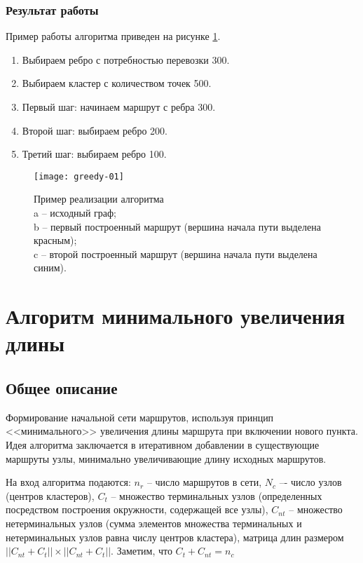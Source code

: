 \subsubsection{Результат работы}
Пример работы алгоритма приведен на рисунке \ref{img:greedy-01}.
\begin{enumerate}
    \item Выбираем ребро с потребностью перевозки 300.
    \item Выбираем кластер с количеством точек 500.
    \item Первый шаг: начинаем маршрут с ребра 300.
    \item Второй шаг: выбираем ребро 200.
    \item Третий шаг: выбираем ребро 100.
\end{enumerate}

\begin{figure}[h!]
    \centering
    \texttt{[image: greedy-01]}
    \caption{Пример реализации алгоритма\\
        a -- исходный граф;\\
        b -- первый построенный маршрут (вершина начала пути выделена красным);\\
        c -- второй построенный маршрут (вершина начала пути выделена синим).
    }
   \label{img:greedy-01}
\end{figure}

\section{Алгоритм минимального увеличения длины}
\label{sec:second_alg}
\subsection{Общее описание}
Формирование начальной сети маршрутов, используя принцип <<минимального>> увеличения длины маршрута при 
включении нового пункта. Идея алгоритма заключается в итеративном добавлении в существующие маршруты узлы, 
минимально увеличивающие длину исходных маршрутов. 

На вход алгоритма подаются: \( n_r \) -- число маршрутов в сети, \( N_c \) –- число узлов 
(центров кластеров), \( C_t \) – множество терминальных узлов (определенных посредством построения 
окружности, содержащей все узлы), \( C_{nt} \) -- множество нетерминальных узлов (сумма элементов множества 
терминальных и нетерминальных узлов равна числу центров кластера), матрица длин размером 
\( ||{C_{nt}} + {C_{t}}|| \times ||{C_{nt}} + {C_{t}}|| \). Заметим, что \( C_t + C_{nt} = n_c \)

